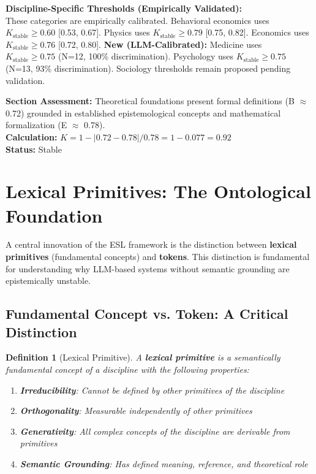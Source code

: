\documentclass[11pt,a4paper]{article}
\newtheorem{definition}{Definition}[section]
\begin{document}
\begin{insightbox}
\textbf{Discipline-Specific Thresholds (Empirically Validated):} \\
These categories are empirically calibrated. Behavioral economics uses $K_{\text{stable}} \geq 0.60$ [0.53, 0.67]. Physics uses $K_{\text{stable}} \geq 0.79$ [0.75, 0.82]. Economics uses $K_{\text{stable}} \geq 0.76$ [0.72, 0.80]. \textbf{New (LLM-Calibrated):} Medicine uses $K_{\text{stable}} \geq 0.75$ (N=12, 100\% discrimination). Psychology uses $K_{\text{stable}} \geq 0.75$ (N=13, 93\% discrimination). Sociology thresholds remain proposed pending validation.
\end{insightbox}

\begin{eslbox}
\textbf{Section Assessment:} Theoretical foundations present formal definitions (B $\approx$ 0.72) grounded in established epistemological concepts and mathematical formalization (E $\approx$ 0.78). \\[0.3em]
\textbf{Calculation:} $K = 1 - |0.72 - 0.78| / 0.78 = 1 - 0.077 = 0.92$ \\
\textbf{Status:} Stable
\end{eslbox}

\section{Lexical Primitives: The Ontological Foundation}
\label{sec:primitive}


A central innovation of the ESL framework is the distinction between \textbf{lexical primitives} (fundamental concepts) and \textbf{tokens}. This distinction is fundamental for understanding why LLM-based systems without semantic grounding are epistemically unstable.

\subsection{Fundamental Concept vs. Token: A Critical Distinction}

\begin{definition}[Lexical Primitive]
\label{def:primitiv}
A \textbf{lexical primitive} is a semantically fundamental concept of a discipline with the following properties:
\begin{enumerate}
    \item \textbf{Irreducibility}: Cannot be defined by other primitives of the discipline
    \item \textbf{Orthogonality}: Measurable independently of other primitives
    \item \textbf{Generativity}: All complex concepts of the discipline are derivable from primitives
    \item \textbf{Semantic Grounding}: Has defined meaning, reference, and theoretical role
\end{enumerate}
\end{definition}
\end{document}
